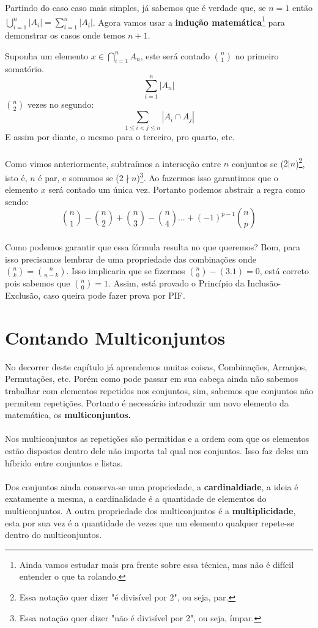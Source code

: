 \documentclass[main.tex]{subfiles}
\begin{document}
\begin{demonstration}[Esboço]
Partindo do caso caso mais simples, já sabemos que é verdade que, se $n = 1$ então $\displaystyle \bigcup_{i = 1}^{n} |A_i| =  \sum_{i = 1}^{n} |A_i|$. Agora vamos usar a \textbf{indução matemática}\footnote{Ainda vamos estudar mais pra frente sobre essa técnica, mas não é difícil entender o que ta rolando.} para demonstrar os casos onde temos $n + 1$.
\end{demonstration}


Suponha um elemento $x \in \bigcap_{i=1}^{n} A_{n}$, este será contado $n \choose 1$ no primeiro somatório.
$$\sum\limits_{i=1}^n |A_{n}|$$
$n \choose 2$ vezes no segundo:
$$\sum\limits_{1 \leq i<j \leq n} |A_{i} \cap A_{j}|$$
E assim por diante, o mesmo para o terceiro, pro quarto, etc.
\\~\\
Como vimos anteriormente, subtraímos a interseção entre $n$ conjuntos se ($2|n$)\footnote{Essa notação quer dizer "é divisível por 2", ou seja, par.}, isto é, $n$ é par, e somamos se ($2 \nmid n$)\footnote{Essa notação quer dizer "não é divisível por 2", ou seja, ímpar.}. Ao fazermos isso garantimos que o elemento $x$ será contado um única vez. Portanto podemos abstrair a regra como sendo:
\begin{equation}
{n \choose 1} - {n \choose 2} +{n \choose 3} -{n \choose 4} ... + (-1)^{p-1} 
{n \choose p}
\end{equation}
\\
Como podemos garantir que essa fórmula resulta no que queremos? Bom, para isso precisamos lembrar de uma propriedade das combinações onde ${n \choose k} = {n \choose n-k}$. Isso implicaria que se fizermos ${n \choose 0} - (3.1) = 0$, está correto pois sabemos que ${n \choose 0} = 1$. Assim, está provado o Princípio da Inclusão-Exclusão, caso queira pode fazer prova por PIF.

\section{Contando Multiconjuntos}
No decorrer deste capítulo já aprendemos muitas coisas, Combinações, Arranjos, Permutações, etc. Porém como pode passar em sua cabeça ainda não sabemos trabalhar com elementos repetidos nos conjuntos, sim, sabemos que conjuntos não permitem repetições. Portanto é necessário introduzir um novo elemento da matemática, os \textbf{multiconjuntos.}
\\~\\
Nos multiconjuntos as repetições são permitidas e a ordem com que os elementos estão dispostos dentro dele não importa tal qual nos conjuntos. Isso faz deles um híbrido entre conjuntos e listas.
\\~\\
Dos conjuntos ainda conserva-se uma propriedade, a \textbf{cardinaldiade}, a ideia é exatamente a mesma, a cardinalidade é a quantidade de elementos do multiconjuntos. A outra propriedade dos multiconjuntos é a \textbf{multiplicidade}, esta por sua vez é a quantidade de vezes que um elemento qualquer repete-se dentro do multiconjuntos.
\end{document}
